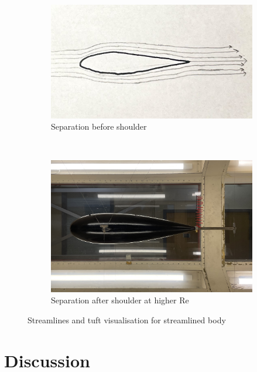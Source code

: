 \documentclass[8pt]{article}
\begin{document}
\begin{figure}[H]
    \centering
    \begin{subfigure}[t]{0.48\textwidth}
        \centering
        \includegraphics[width=1\textwidth]{Images_Videos/stream_streamlined_2.jpg}
        \caption{Separation before shoulder}
        \label{fig:figure10}
    \end{subfigure}
    ~
    \begin{subfigure}[t]{0.42\textwidth}
        \centering
        \includegraphics[width=1\textwidth]{Images_Videos/Streamlined_8milibar.JPG}
        \caption{Separation after shoulder at higher Re}
        \label{fig:figure11}
    \end{subfigure}
    \caption{Streamlines and tuft visualisation for streamlined body}
\end{figure}

\section{Discussion}
\end{document}
